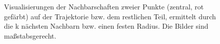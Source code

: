 \begin{figure}
    \hfill
    \par\medskip
    \hfill
    \caption{Visualisierungen der Nachbarschaften zweier Punkte (zentral, rot gefärbt) auf der Trajektorie bzw. dem restlichen Teil, ermittelt durch die k nächsten Nachbarn bzw. einen festen Radius. Die Bilder sind maßstabsgerecht.}
    \label{fig:knn_vs_scale}
\end{figure}

